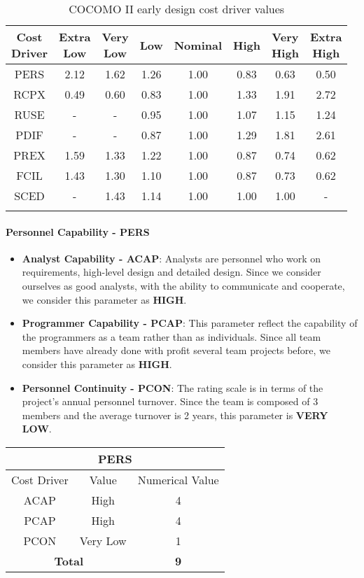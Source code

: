 \begin{longtable}{c|ccccccc}
\toprule
\specialcell{Cost\\Driver}&\specialcell{Extra\\Low}&\specialcell{Very\\Low}&Low&Nominal&High&\specialcell{Very\\High}&\specialcell{Extra\\High}\\
\midrule
PERS &2.12 &1.62 &1.26 &1.00 &0.83 &0.63 &0.50\\
RCPX &0.49 &0.60 &0.83 &1.00 &1.33 &1.91 &2.72\\
RUSE &-	   &-	 &0.95 &1.00 &1.07 &1.15 &1.24\\
PDIF &-	   &-    &0.87 &1.00 &1.29 &1.81 &2.61\\
PREX &1.59 &1.33 &1.22 &1.00 &0.87 &0.74 &0.62\\
FCIL &1.43 &1.30 &1.10 &1.00 &0.87 &0.73 &0.62\\
SCED &-	   &1.43 &1.14 &1.00 &1.00 &1.00 &-\\
\bottomrule
\caption{\label{tbl:costDriverConversionValue}COCOMO II early design cost driver values}
\end{longtable}

\paragraph{Personnel Capability - PERS}
\begin{itemize}
	\item \textbf{Analyst Capability - ACAP}: Analysts are personnel who work on requirements, high-level design and detailed design. Since we consider ourselves as good analysts, with the ability to communicate and cooperate, we consider this parameter as \textbf{HIGH}.
	\item \textbf{Programmer Capability - PCAP}: This parameter reflect the capability of the programmers as a team rather than as individuals. Since all team members have already done with profit several team projects before, we consider this parameter as \textbf{HIGH}.
	\item \textbf{Personnel Continuity - PCON}: The rating scale is in terms of the project’s annual personnel turnover. Since the team is composed of 3 members and the average turnover is 2 years, this parameter is \textbf{VERY LOW}.
\end{itemize}

\begin{longtable}{ccc}
\multicolumn{3}{c}{\textbf{PERS}}\\
\toprule
Cost Driver&Value&Numerical Value\\
\midrule
ACAP&High&4\\
PCAP&High&4\\
PCON&Very Low&1\\
\midrule
\multicolumn{2}{c}{\textbf{Total}}&\textbf{9}\\
\bottomrule
\end{longtable}

